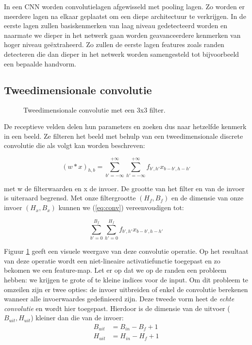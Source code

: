 \npar In een CNN worden convolutielagen afgewisseld met pooling lagen. Zo worden er meerdere lagen na elkaar geplaatst om een diepe architectuur te verkrijgen. In de eerste lagen zullen basiskenmerken van laag niveau gedetecteerd worden en naarmate we dieper in het netwerk gaan worden geavanceerdere kenmerken van hoger niveau ge\"extraheerd. Zo zullen de eerste lagen features zoals randen detecteren die dan dieper in het netwerk worden samengesteld tot bijvoorbeeld een bepaalde handvorm.

\subsection{Tweedimensionale convolutie}
 \begin{figure}[!t]
 	\centering
 	\def\svgwidth{0.55\columnwidth}
 	
 	\caption{Tweedimensionale convolutie met een 3x3 filter.}
 	\label{fig:conv}
 \end{figure}
De receptieve velden delen hun parameters en zoeken dus naar hetzelfde kenmerk in een beeld. Ze filteren het beeld met behulp van een tweedimensionale discrete convolutie die als volgt kan worden beschreven:

\begin{equation}\label{eq:conv}
(w * x)_{h,b} = \sum_{b'=-\infty}^{+\infty}\sum_{h'=-\infty}^{+\infty} f_{b',h'}x_{b-b',h-h'}
\end{equation}

\npar met w de filterwaarden en x de invoer. De grootte van het filter en van de invoer is uiteraard begrensd. Met onze filtergrootte $(H_f,B_f)$ en de dimensie van onze invoer $(H_x,B_x)$ kunnen we (\ref{eq:conv}) vereenvoudigen tot:

\begin{equation}
\sum_{b'=0}^{B_f}\sum_{h'=0}^{H_f} f_{b',h'}x_{b-b',h-h'}
\end{equation}

\npar Figuur \ref{fig:conv} geeft een visuele weergave van deze convolutie operatie. Op het resultaat van deze operatie wordt een niet-lineaire activatiefunctie toegepast en zo bekomen we een feature-map. Let er op dat we op de randen een probleem hebben: we krijgen te grote of te kleine indices voor de input. Om dit probleem te omzeilen zijn er twee opties: de invoer uitbreiden of enkel de convolutie berekenen wanneer alle invoerwaardes gedefinieerd zijn. Deze tweede vorm heet de \textit{echte convolutie} en wordt hier toegepast. Hierdoor is de dimensie van de uitvoer ($B_{uit},H_{uit}$) kleiner dan die van de invoer:
\begin{equation}
\begin{aligned}
B_{uit}&=B_{in}-B_f+1 \\
H_{uit}&=H_{in}-H_f+1
\end{aligned}
\end{equation}

